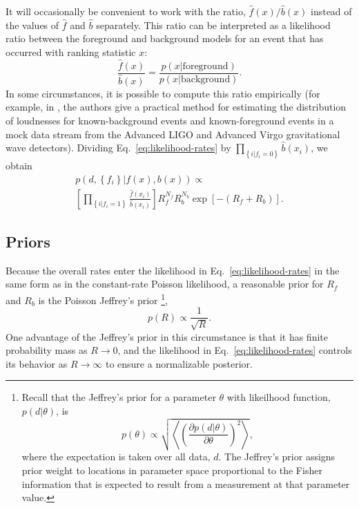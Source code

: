 \documentclass[aps,prd,reprint]{revtex4-1}
\begin{document}
It will occasionally be convenient to work with the ratio,
$\hat{f}(x)/\hat{b}(x)$ instead of the values of $\hat{f}$ and
$\hat{b}$ separately.  This ratio can be interpreted as a likelihood
ratio between the foreground and background models for an event that
has occurred with ranking statistic $x$:
\begin{equation}
  \label{eq:loudness-likelihood}
  \frac{\hat{f}(x)}{\hat{b}(x)} = \frac{p(x|\mathrm{foreground})}{p(x|\mathrm{background})}.
\end{equation}
In some circumstances, it is possible to compute this ratio
empirically (for example, in \citet{Cannon2012}, the authors give a
practical method for estimating the distribution of loudnesses for
known-background events and known-foreground events in a mock data
stream from the Advanced LIGO and Advanced Virgo gravitational wave
detectors).  Dividing Eq.~\eqref{eq:likelihood-rates} by
$\prod_{\left\{ i | f_i = 0 \right\}} \hat{b}(x_i)$, we obtain
\begin{multline}
  \label{eq:likelihood-ratio}
  p\left(d, \left\{ f_i \right\} | f(x), b(x) \right) \propto  \\ \left[
    \prod_{\left\{ i | f_i = 1 \right\}}
    \frac{\hat{f}(x_i)}{\hat{b}(x_i)} \right] R_f^{N_f} R_b^{N_b}
  \exp\left[ - \left( R_f + R_b \right) \right].
\end{multline}

\subsection{Priors}

Because the overall rates enter the likelihood in
Eq.~\eqref{eq:likelihood-rates} in the same form as in the
constant-rate Poisson likelihood, a reasonable prior for $R_f$ and
$R_b$ is the Poisson Jeffrey's prior%
\footnote{Recall that the Jeffrey's prior for a parameter $\theta$
  with likeilhood function, $p(d|\theta)$, is
  \begin{equation}
    p(\theta) \propto \sqrt{\left\langle \left( \frac{\partial
          p(d | \theta) }{\partial \theta} \right)^2 \right\rangle},
  \end{equation}
  where the expectation is taken over all data, $d$.  The Jeffrey's
  prior assigns prior weight to locations in parameter space
  proportional to the Fisher information that is expected to result
  from a measurement at that parameter value.}, %
\begin{equation}
  \label{eq:Jeffrey-prior}
  p(R) \propto \frac{1}{\sqrt{R}}.
\end{equation}
One advantage of the Jeffrey's prior in this circumstance is that it
has finite probability mass as $R \to 0$, and the likelihood in
Eq.~\eqref{eq:likelihood-rates} controls its behavior as $R\to \infty$
to ensure a normalizable posterior.  
\end{document}
